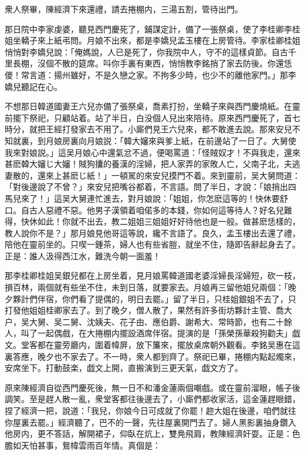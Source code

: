 衆人祭畢，陳經濟下來還禮，請去捲棚内，三湯五割，管待出門。

那日院中李家虔婆，聽見西門慶死了，鋪謀定計，備了一張祭桌，使了李桂卿李桂姐坐轎子來上紙弔問。月娘不出來，都是李嬌兒孟玉樓在上房管待。李家桂卿桂姐悄悄對李嬌兒說：「俺媽說，人已是死了，你我院中人，守不的這樣貞節。自古千里長棚，沒個不散的筵席。呌你手裏有東西，悄悄教李銘捎了家去防後。你還恁儍！常言道：揚州雖好，不是久戀之家。不拘多少時，也少不的離他家門。」那李嬌兒聽記在心。

不想那日韓道國妻王六兒亦備了張祭桌，喬素打扮，坐轎子來與西門慶燒紙。在靈前擺下祭祀，只顧站着。站了半日，白没個人兒出來陪待。原來西門慶死了，首七時分，就把王經打發家去不用了。小廝們見王六兒來，都不敢進去說。那來安兒不知就裏，到月娘房裏向月娘説：「韓大嬸來與爹上紙，在前邊站了一日了。大舅使我來對娘説。」這吴月娘心中還氣忿不過，便喝罵道：「怪賊奴才！不與我走，還來甚麽韓大嬸じ大嬸！賊狗攮的養漢的淫婦，把人家弄的家敗人亡，父南子北，夫逃妻散的，還來上甚麽じ紙！」一頓駡的來安兒摸門不着。來到靈前，吴大舅問道：「對後邊說了不曾？」來安兒把嘴谷都着，不言語。問了半日，才說：「娘捎出四馬兒來了！」這吴大舅連忙進去，對月娘說：「姐姐，你怎麽這等的！快休要舒口。自古人惡禮不惡。他男子漢領着咱偌多的本錢，你如何這等待人？好名兒難得，快休如此！你就不出去，教二姐姐三姐姐好好待他也是一般。做甚麽恁樣的，教人說你不是？」那月娘見他哥這等說，纔不言語了。良久，孟玉樓出去還了禮，陪他在靈前坐的。只喫一鍾茶，婦人也有些省䐩，就坐不住，隨即告辭起身去了。正是：誰人汲得西江水，難洗今朝一面羞！

那李桂卿桂姐吴銀兒都在上房坐着，見月娘罵韓道國老婆淫婦長淫婦短，砍一枝，損百林，兩個就有些坐不住，未到日落，就要家去。月娘再三留他姐兒兩個：「晚夕夥計們伴宿，你們看了提偶的，明日去罷。」留了半日，只桂姐銀姐不去了，只打發他姐姐桂卿家去了。到了晚夕，僧人散了，果然有許多街坊夥計主管、喬大户，吴大舅、吴二舅、沈姨夫、花子由、應伯爵、謝希大、常時節，也有二十餘人，叫了一起偶戲，在大捲棚内擺設酒席伴宿。提演的是「孫榮孫華殺狗勸夫」戯文。堂客都在靈旁廳内，圍着幃屏，放下簾來，擺放桌席朝外觀看。李銘吴惠在這裏答應，晚夕也不家去了。不一時，衆人都到齊了。祭祀已畢，捲棚内點起燭來，安席坐下。打動鼓楽，戯文上開，直搬演到三更天氣，戯文方了。

原來陳經濟自從西門慶死後，無一日不和潘金蓮兩個嘲戲。或在靈前溜眼，帳子後調笑。至是趕人散一亂，衆堂客都往後邊去了，小廝們都收家活，這金蓮趕眼錯，捏了經濟一把，說道：「我兒，你娘今日可成就了你罷！趂大姐在後邊，咱們就往你屋裏去罷。」經濟聽了，巴不的一聲，先往屋裏開門去了。婦人黑影裏抽身鑽入他房内，更不答話，解開裙子，仰臥在炕上，雙鳧飛肩，教陳經濟奸耍。正是：色膽如天怕甚事，鴛幃雲雨百年情。真個是：

